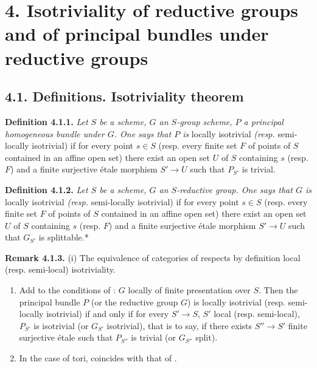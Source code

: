 \section*{4. Isotriviality of reductive groups and of principal bundles under reductive groups}

\subsection*{4.1. Definitions. Isotriviality theorem}

\textbf{Definition 4.1.1.} \emph{Let \(S\) be a scheme, \(G\) an \(S\)-group scheme, \(P\) a principal homogeneous bundle under \(G\). One
says that \(P\) is} locally isotrivial \emph{(resp.} semi-locally isotrivial) if for every point \(s \in S\) (resp. every
finite set \(F\) of points of \(S\) contained in an affine open set) there exist an open set \(U\) of \(S\) containing \(s\)
(resp. \(F\)) and a finite surjective étale morphism \(S' \to U\) such that \(P_{S'}\) is trivial.

\textbf{Definition 4.1.2.} \emph{Let \(S\) be a scheme, \(G\) an \(S\)-reductive group. One says that \(G\) is} locally isotrivial
\emph{(resp.} semi-locally isotrivial) if for every point \(s \in S\) (resp. every finite set \(F\) of points of \(S\) contained
in an affine open set) there exist an open set \(U\) of \(S\) containing \(s\) (resp. \(F\)) and a finite surjective étale
morphism \(S' \to U\) such that \(G_{S'}\) is splittable.*

\textbf{Remark 4.1.3.} (i) The equivalence of categories  of  respects by definition local (resp. semi-local)
isotriviality.

\begin{enumerate}
\def\labelenumi{(\roman{enumi})}
\setcounter{enumi}{1}
\item
  Add to the conditions of : \(G\) locally of finite presentation over \(S\). Then the principal bundle \(P\) (or the
  reductive group \(G\)) is locally isotrivial (resp. semi-locally isotrivial) if and only if for every \(S' \to S\), \(S'\)
  local (resp. semi-local), \(P_{S'}\) is isotrivial (or \(G_{S'}\) isotrivial), that is to say, if there exists \(S'' \to S'\)
  finite surjective étale such that \(P_{S''}\) is trivial (or \(G_{S''}\) split).
\item
  In the case of tori,  coincides with that of .
\end{enumerate}

